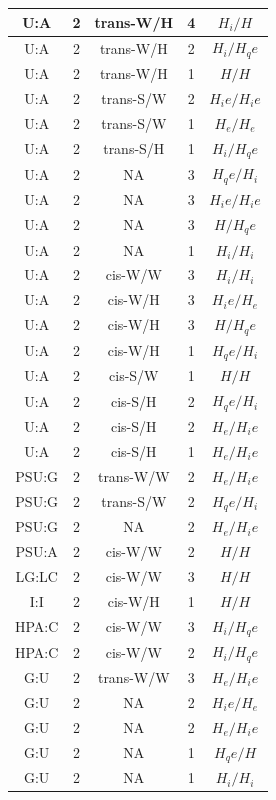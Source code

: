\begin{center}
\begin{longtable}{c|c|c|c|c}
U:A & 2 & trans-W/H & 4 & $H_i/H$ \\  \hline
U:A & 2 & trans-W/H & 2 & $H_i/H_qe$ \\  \hline
U:A & 2 & trans-W/H & 1 & $H/H$ \\  \hline
U:A & 2 & trans-S/W & 2 & $H_ie/H_ie$ \\  \hline
U:A & 2 & trans-S/W & 1 & $H_e/H_e$ \\  \hline
U:A & 2 & trans-S/H & 1 & $H_i/H_qe$ \\  \hline
U:A & 2 & NA & 3 & $H_qe/H_i$ \\  \hline
U:A & 2 & NA & 3 & $H_ie/H_ie$ \\  \hline
U:A & 2 & NA & 3 & $H/H_qe$ \\  \hline
U:A & 2 & NA & 1 & $H_i/H_i$ \\  \hline
U:A & 2 & cis-W/W & 3 & $H_i/H_i$ \\  \hline
U:A & 2 & cis-W/H & 3 & $H_ie/H_e$ \\  \hline
U:A & 2 & cis-W/H & 3 & $H/H_qe$ \\  \hline
U:A & 2 & cis-W/H & 1 & $H_qe/H_i$ \\  \hline
U:A & 2 & cis-S/W & 1 & $H/H$ \\  \hline
U:A & 2 & cis-S/H & 2 & $H_qe/H_i$ \\  \hline
U:A & 2 & cis-S/H & 2 & $H_e/H_ie$ \\  \hline
U:A & 2 & cis-S/H & 1 & $H_e/H_ie$ \\  \hline
PSU:G & 2 & trans-W/W & 2 & $H_e/H_ie$ \\  \hline
PSU:G & 2 & trans-S/W & 2 & $H_qe/H_i$ \\  \hline
PSU:G & 2 & NA & 2 & $H_e/H_ie$ \\  \hline
PSU:A & 2 & cis-W/W & 2 & $H/H$ \\  \hline
LG:LC & 2 & cis-W/W & 3 & $H/H$ \\  \hline
I:I & 2 & cis-W/H & 1 & $H/H$ \\  \hline
HPA:C & 2 & cis-W/W & 3 & $H_i/H_qe$ \\  \hline
HPA:C & 2 & cis-W/W & 2 & $H_i/H_qe$ \\  \hline
G:U & 2 & trans-W/W & 3 & $H_e/H_ie$ \\  \hline
G:U & 2 & NA & 2 & $H_ie/H_e$ \\  \hline
G:U & 2 & NA & 2 & $H_e/H_ie$ \\  \hline
G:U & 2 & NA & 1 & $H_qe/H$ \\  \hline
G:U & 2 & NA & 1 & $H_i/H_i$ \\  \hline

\end{longtable}
\end{center}
